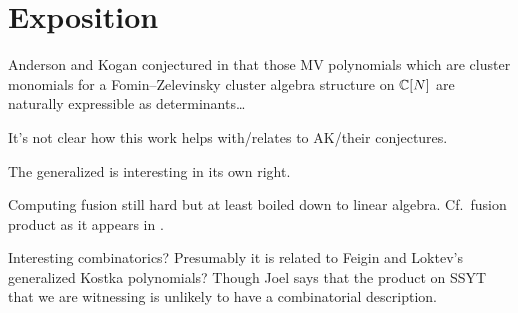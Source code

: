 \documentclass[draft]{article}
\begin{document}
\begin{comment}

\end{comment}

\section{Exposition}
\label{s:exposition}

Anderson and Kogan conjectured in \cite{anderson2006algebra}  that those MV polynomials which are cluster monomials for a Fomin--Zelevinsky cluster algebra structure on $\mathbb C[N]$ are naturally expressible as determinants\dots

It's not clear how this work helps with/relates to AK/their conjectures.

The generalized \mvy is interesting in its own right. 

Computing fusion still hard but at least boiled down to linear algebra. Cf.\ fusion product as it appears in \cite{beilinson1991quantization,feigin2generalized,mirkovic2007geometric,anderson2006algebra,bezrukavnikov2005equivariant}.

Interesting combinatorics? Presumably it is related to Feigin and Loktev's generalized Kostka polynomials? Though Joel says that the product on SSYT that we are witnessing is unlikely to have a combinatorial description. 
\end{document}
